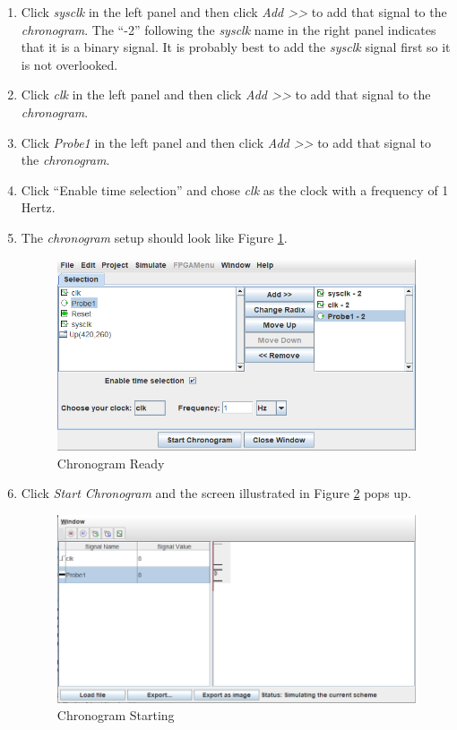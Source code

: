 \begin{enumerate}
	\item Click \textit{sysclk} in the left panel and then click \textit{Add >>} to add that signal to the \textit{chronogram}. The ``-2'' following the \textit{sysclk} name in the right panel indicates that it is a binary signal. It is probably best to add the \textit{sysclk} signal first so it is not overlooked.
	\item Click \textit{clk} in the left panel and then click \textit{Add >>} to add that signal to the \textit{chronogram}.
	\item Click \textit{Probe1} in the left panel and then click \textit{Add >>} to add that signal to the \textit{chronogram}.
	\item Click ``Enable time selection'' and chose \textit{clk} as the clock with a frequency of 1 Hertz.
	\item The \textit{chronogram} setup should look like Figure \ref{fig:count-09}.
	
	\begin{figure}[H]
		\centering
		\includegraphics[width=\maxwidth{.95\linewidth}]{gfx/count-09}
		\caption{Chronogram Ready}
		\label{fig:count-09}
	\end{figure}

	\item Click \textit{Start Chronogram} and the screen illustrated in Figure \ref{fig:count-10} pops up.
	
	\begin{figure}[H]
		\centering
		\includegraphics[width=\maxwidth{.95\linewidth}]{gfx/count-10}
		\caption{Chronogram Starting}
		\label{fig:count-10}
	\end{figure}
	

\end{enumerate}
